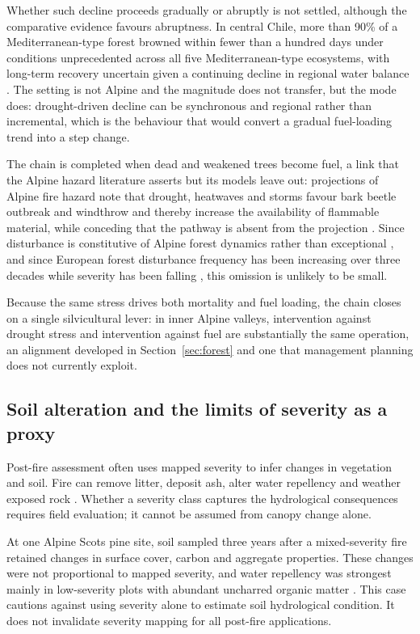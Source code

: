 \documentclass[11pt,a4paper]{article}
\begin{document}
Whether such decline proceeds gradually or abruptly is not settled, although the comparative evidence favours abruptness. In central Chile, more than 90\% of a Mediterranean-type forest browned within fewer than a hundred days under conditions unprecedented across all five Mediterranean-type ecosystems, with long-term recovery uncertain given a continuing decline in regional water balance \citep{miranda_widespread_2023}. The setting is not Alpine and the magnitude does not transfer, but the mode does: drought-driven decline can be synchronous and regional rather than incremental, which is the behaviour that would convert a gradual fuel-loading trend into a step change.

The chain is completed when dead and weakened trees become fuel, a link that the Alpine hazard literature asserts but its models leave out: projections of Alpine fire hazard note that drought, heatwaves and storms favour bark beetle outbreak and windthrow and thereby increase the availability of flammable material, while conceding that the pathway is absent from the projection \citep{gerberding_mapping_2025}. Since disturbance is constitutive of Alpine forest dynamics rather than exceptional \citep{bebi_changes_2017}, and since European forest disturbance frequency has been increasing over three decades while severity has been falling \citep{senf_mapping_2021}, this omission is unlikely to be small.

Because the same stress drives both mortality and fuel loading, the chain closes on a single silvicultural lever: in inner Alpine valleys, intervention against drought stress and intervention against fuel are substantially the same operation, an alignment developed in Section~\ref{sec:forest} and one that management planning does not currently exploit.

\subsection{Soil alteration and the limits of severity as a proxy}

Post-fire assessment often uses mapped severity to infer changes in vegetation and soil. Fire can remove litter, deposit ash, alter water repellency and weather exposed rock \citep{santi_wildfire_2022}. Whether a severity class captures the hydrological consequences requires field evaluation; it cannot be assumed from canopy change alone.

At one Alpine Scots pine site, soil sampled three years after a mixed-severity fire retained changes in surface cover, carbon and aggregate properties. These changes were not proportional to mapped severity, and water repellency was strongest mainly in low-severity plots with abundant uncharred organic matter \citep{negri_wildfire_2026}. This case cautions against using severity alone to estimate soil hydrological condition. It does not invalidate severity mapping for all post-fire applications.
\end{document}
